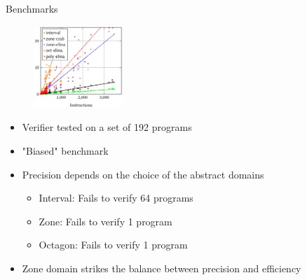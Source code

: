 \documentclass[aspectratio=169]{beamer}
\begin{document}
\begin{frame}{Benchmarks}
  \begin{figure}
    \centering
    \includegraphics[width=0.3\textwidth]{benchmark.png}
  \end{figure}
  \begin{itemize}
  \item Verifier tested on a set of 192 programs
  \item "Biased" benchmark
  \item Precision depends on the choice of the abstract domains
  \begin{itemize}
    \item Interval: Fails to verify 64 programs
    \item Zone: Fails to verify 1 program
    \item Octagon: Fails to verify 1 program
  \end{itemize}
  \item Zone domain strikes the balance between precision and efficiency
  \end{itemize}
\end{frame}

\begin{frame}{}
\end{frame}
\end{document}
